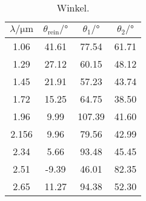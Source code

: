 \begin{table} \caption{Winkel.}
    \label{tab:skaliert}
    \centering
    \begin{tabular}{cccc}
        \toprule
        {$\lambda / \si{\micro\meter}$} & {$\theta_\text{rein}/ \si{\degree}$} & {$\theta_1/ \si{\degree}$} & {$\theta_2/ \si{\degree}$} \\
        \midrule
     1.06 &  41.61 &  77.54   &   61.71 \\
     1.29 &  27.12 &  60.15   &   48.12 \\
     1.45 &  21.91 &  57.23   &   43.74 \\
     1.72 &  15.25 &  64.75   &   38.50 \\
     1.96 &  9.99  &  107.39  &   41.60 \\
     2.156&  9.96  &  79.56   &   42.99 \\
     2.34 &  5.66  &  93.48   &   45.45 \\
     2.51 &  -9.39 &  46.01   &   82.35 \\
     2.65 &  11.27 &  94.38   &   52.30 \\
        
        \bottomrule
    \end{tabular}
\end{table}